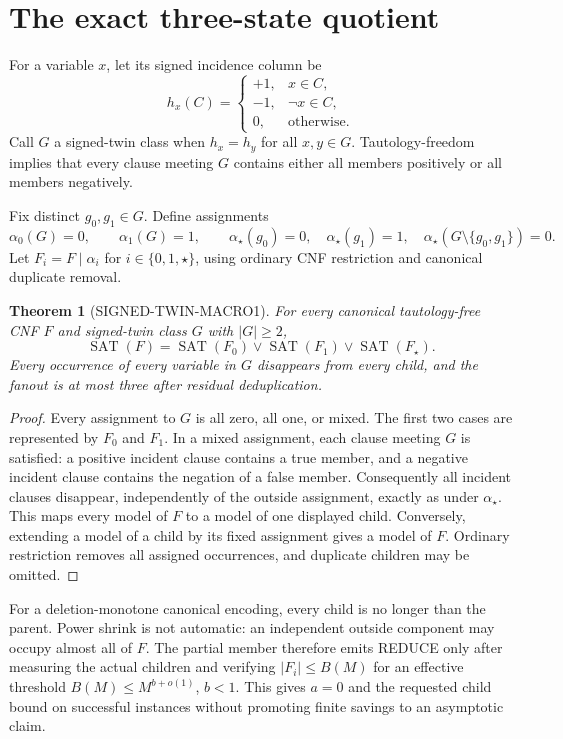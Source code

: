 \documentclass[11pt]{article}
\newtheorem{theorem}{Theorem}
\newcommand{\SAT}{\operatorname{SAT}}
\begin{document}
\section{The exact three-state quotient}
For a variable $x$, let its signed incidence column be
\[
 h_x(C)=\begin{cases}
  +1,&x\in C,\\
  -1,&\neg x\in C,\\
  0,&\text{otherwise.}
 \end{cases}
\]
Call $G$ a signed-twin class when $h_x=h_y$ for all $x,y\in G$.
Tautology-freedom implies that every clause meeting $G$ contains either all
members positively or all members negatively.

Fix distinct $g_0,g_1\in G$.  Define assignments
\[
 \alpha_0(G)=0,\qquad \alpha_1(G)=1,
 \qquad \alpha_\star(g_0)=0,\quad\alpha_\star(g_1)=1,
 \quad\alpha_\star(G\setminus\{g_0,g_1\})=0.
\]
Let $F_i=F\mathbin{|}\alpha_i$ for $i\in\{0,1,\star\}$, using ordinary
CNF restriction and canonical duplicate removal.

\begin{theorem}[SIGNED-TWIN-MACRO1]
For every canonical tautology-free CNF $F$ and signed-twin class
$G$ with $|G|\ge2$,
\[
 \SAT(F)=\SAT(F_0)\lor\SAT(F_1)\lor\SAT(F_\star).
\]
Every occurrence of every variable in $G$ disappears from every child, and
the fanout is at most three after residual deduplication.
\end{theorem}
\begin{proof}
Every assignment to $G$ is all zero, all one, or mixed.  The first two cases
are represented by $F_0$ and $F_1$.  In a mixed assignment, each clause
meeting $G$ is satisfied: a positive incident clause contains a true member,
and a negative incident clause contains the negation of a false member.
Consequently all incident clauses disappear, independently of the outside
assignment, exactly as under $\alpha_\star$.  This maps every model of $F$ to
a model of one displayed child.  Conversely, extending a model of a child by
its fixed assignment gives a model of $F$.  Ordinary restriction removes all
assigned occurrences, and duplicate children may be omitted.
\end{proof}

For a deletion-monotone canonical encoding, every child is no longer than the
parent.  Power shrink is not automatic: an independent outside component may
occupy almost all of $F$.  The partial member therefore emits REDUCE only
after measuring the actual children and verifying
$|F_i|\le B(M)$ for an effective threshold
$B(M)\le M^{b+o(1)}$, $b<1$.  This gives $a=0$ and the requested child bound
on successful instances without promoting finite savings to an asymptotic
claim.
\end{document}
